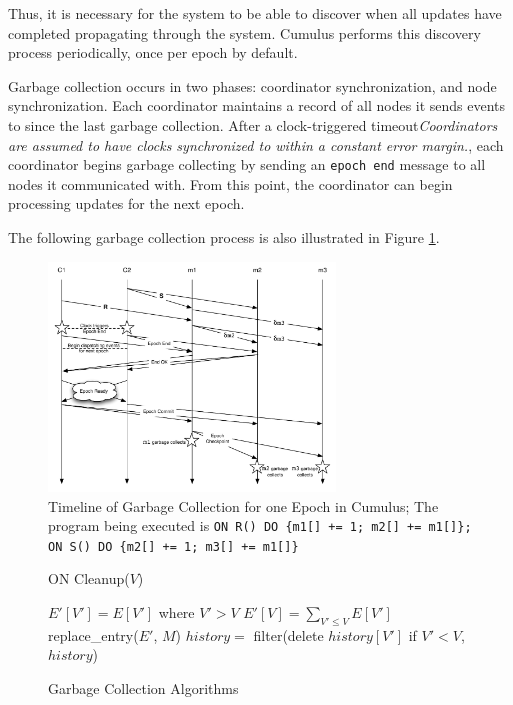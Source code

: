\documentclass{vldb}
\begin{document}
Thus, it is necessary for the system to be able to discover when all updates have completed propagating through the system.  Cumulus performs this discovery process periodically, once per epoch by default.  


Garbage collection occurs in two phases: coordinator synchronization, and node synchronization.  Each coordinator maintains a record of all nodes it sends events to since the last garbage collection.  After a clock-triggered timeout\textit{Coordinators are assumed to have clocks synchronized to within a constant error margin.}, each coordinator begins garbage collecting by sending an \texttt{epoch end} message to all nodes it communicated with.  From this point, the coordinator can begin processing updates for the next epoch.

The following garbage collection process is also illustrated in Figure \ref{fig:GCflowchart}.

\begin{figure}
\begin{center}
\includegraphics[width=3in]{graphics/GCflowchart}
\caption{Timeline of Garbage Collection for one Epoch in Cumulus; The program being executed is \texttt{ON R() DO \{m1[] += 1; m2[] += m1[]\}; ON S() DO \{m2[] += 1; m3[] += m1[]\}} }
\label{fig:GCflowchart}
\end{center}

\end{figure}

\begin{figure}
ON Cleanup($V$)
\begin{algorithmic}[1]
    \STATE $E'[V'] = E[V']$ where $V' > V$
    \STATE $E'[V] = \sum_{V' \leq V} E[V']$
    \STATE replace\_entry($E'$, $M$)
  \ENDFOR
\ENDFOR
\STATE $history =$ filter(delete $history[V']$ if $V' < V$, $history$)
\end{algorithmic}
\caption{Garbage Collection Algorithms}
\label{fig:gcalgorithms}
\end{figure}
\end{document}
